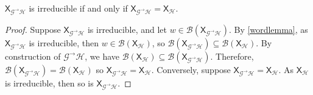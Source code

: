 \documentclass{article}
\newcommand{\Lc}{\mathcal{L}}  %
\newcommand{\Gc}{\mathcal{G}}  %
\newcommand{\Hc}{\mathcal{H}}  %
\newcommand{\Bc}{\mathcal{B}}
\newcommand{\GtH}{\Gc^\to\Hc}
\newcommand{\shift}[1]{\mathsf{X}_{#1}}
\theoremstyle{definition}
\begin{document}


\begin{theorem}\label{irreq}
    \(\shift{\GtH}\) is irreducible if and only if \(\shift{\GtH} = \shift{\Hc}\).
\end{theorem}

\begin{proof}
    Suppose \(\shift{\GtH}\) is irreducible, and let \(w \in \Bc(\shift{\GtH})\). By \ref{wordlemma}, 
    as \(\shift{\GtH}\) is irreducible, then \(w \in \Bc(\shift{\Hc})\), so \(\Bc(\shift{\GtH}) \subseteq \Bc(\shift{\Hc})\).
    By construction of \(\GtH\), we have \(\Bc(\shift{\Hc}) \subseteq \Bc(\shift{\GtH})\). Therefore, 
    \(\Bc(\shift{\GtH}) = \Bc(\shift{\Hc})\) so \(\shift{\GtH} = \shift{\Hc}\).
    Conversely, suppose \(\shift{\GtH} = \shift{\Hc}\). As \(\shift{\Hc}\) is irreducible, then so 
    is \(\shift{\GtH}\).
\end{proof}
\end{document}
